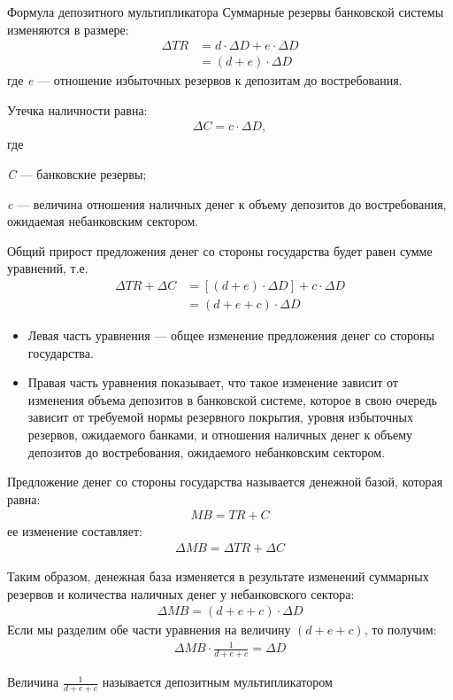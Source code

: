\documentclass[_DKB_p1_Money.tex]{subfiles}
\begin{document}
\begin{frame}[allowframebreaks]{Формула депозитного мультипликатора}
Суммарные резервы банковской системы изменяются в размере:
\begin{align}
\Delta TR&=d\cdot \Delta D + e \cdot \Delta D \nonumber\\
&= (d+e)\cdot \Delta D
\end{align}
где \textit{e} — отношение избыточных резервов к депозитам до востребования.

\pagebreak
Утечка наличности равна:
\begin{align}
\Delta C = c \cdot \Delta D,
\end{align}
где 

\textit{C} — банковские резервы;

\textit{c} — величина отношения наличных денег к объему депозитов до востребования, ожидаемая небанковским сектором.

\pagebreak
Общий прирост предложения денег со стороны государства будет равен сумме уравнений, т.е.
\begin{align}
\Delta TR + \Delta C &= [(d+e) \cdot \Delta D] + c \cdot \Delta D \nonumber \\
&= (d+e+c) \cdot \Delta D
\end{align}

\pagebreak
\begin{itemize}
\item
Левая часть уравнения — общее изменение предложения денег со стороны государства. 

\item
Правая часть уравнения показывает, что такое изменение зависит от изменения объема депозитов в банковской системе, которое в свою очередь зависит от требуемой нормы резервного покрытия, уровня избыточных резервов, ожидаемого банками, и отношения наличных денег к объему депозитов до востребования, ожидаемого небанковским сектором.
\end{itemize}

\pagebreak
Предложение денег со стороны государства называется денежной базой, которая равна:
\begin{align}
MB=TR+C
\end{align}
ее изменение составляет:
\begin{align}
\Delta MB=\Delta TR+\Delta C
\end{align}

\pagebreak
Таким образом, денежная база изменяется в результате изменений суммарных резервов и количества наличных денег у небанковского сектора:
\begin{align}
\Delta MB = (d+e+c) \cdot \Delta D
\end{align}
Если мы разделим обе части уравнения на величину $(d+e+c)$, то получим:
\begin{align}
\Delta MB \cdot \frac{1}{d+e+c} = \Delta D
\end{align}

Величина $\frac{1}{d+e+c}$ называется депозитным мультипликатором
\end{frame}
\end{document}
